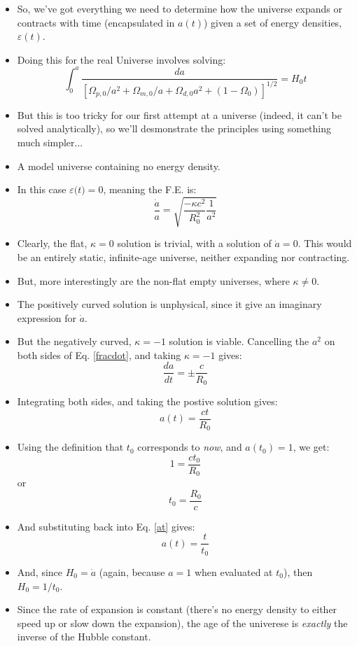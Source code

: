 \documentclass[11pt]{article}
\newcommand{\vep}[1]{\ensuremath{\varepsilon#1}}
\begin{document}
\begin{itemize}
\item So, we've got everything we need to determine how the universe expands or contracts with time (encapsulated in $a(t)$) given a set of energy densities, \vep{(t)}.
\item Doing this for the real Universe involves solving:
\begin{equation}
\int_0^a\frac{da}{\left[\Omega_{p,0}/a^2 + \Omega_{m,0}/a + \Omega_{d,0}a^2+(1-\Omega_0)\right]^{1/2}} = H_0t
\end{equation}
\item But this is too tricky for our first attempt at a universe (indeed, it can't be solved analytically), so we'll desmonstrate the principles using something much simpler...
\item A model universe containing no energy density.
\item In this case $\vep(t)=0$, meaning the F.E. is:
\begin{equation}
\label{fracdot}
    \frac{\dot{a}}{a} = \sqrt{\frac{-\kappa c^2}{R_0^2}\frac{1}{a^2}}
\end{equation}
\item Clearly, the flat, $\kappa=0$ solution is trivial, with a solution of $\dot{a}=0$. This would be an entirely static, infinite-age universe, neither expanding nor contracting.
\item But, more interestingly are the non-flat empty universes, where $\kappa\ne0$.
\item The positively curved solution is unphysical, since it give an imaginary expression for $\dot{a}$.
\item But the negatively curved, $\kappa=-1$ solution is viable. Cancelling the $a^2$ on both sides of Eq. \ref{fracdot}, and taking $\kappa=-1$ gives:
\begin{equation}
\frac{da}{dt} = \pm\frac{c}{R_0}
\end{equation}    
\item Integrating both sides, and taking the postive solution gives:
\begin{equation}
\label{at}
    a(t) = \frac{ct}{R_0}
\end{equation}    
\item Using the definition that $t_0$ corresponds to {\it now}, and $a(t_0)=1$, we get:
\begin{equation}
1 = \frac{ct_0}{R_0}
\end{equation}    
or
\begin{equation}
    t_0 = \frac{R_0}{c}
\end{equation}    
\item And substituting back into Eq. \ref{at} gives:
\begin{equation}
    a(t) = \frac{t}{t_0}
\end{equation}    
\item And, since $H_0=\dot{a}$ (again, because $a=1$ when evaluated at $t_0$), then $H_0=1/t_0$.
\item Since the rate of expansion is constant (there's no energy density to either speed up or slow down the expansion), the age of the univerese is {\it exactly} the inverse of the Hubble constant.

\end{itemize}
\end{document}
